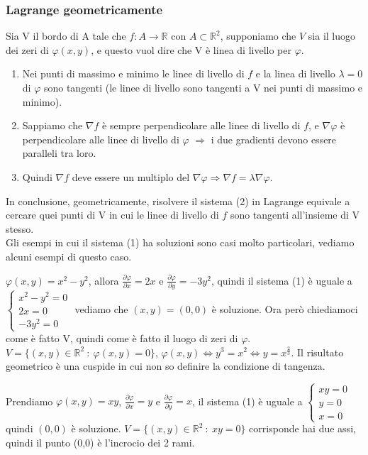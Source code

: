 \subsubsection{Lagrange geometricamente}
Sia V il bordo di A tale che $f: A \to \mathbb{R}$ con $A \subset \mathbb{R}^2$, supponiamo che $V$ sia il luogo dei zeri di $\varphi(x,y)$, e questo vuol dire che V è linea di livello per $\varphi$.
\begin{enumerate}
    \item Nei punti di massimo e minimo le linee di livello di $f$ e la linea di livello $\lambda=0$ di $\varphi$ sono tangenti (le linee di livello sono tangenti a V nei punti di massimo e minimo).
    \item Sappiamo che $\nabla f$ è sempre perpendicolare alle linee di livello di $f$, e $\nabla \varphi$ è perpendicolare alle linee di livello di $\varphi$ $\Longrightarrow$ i due gradienti devono essere paralleli tra loro.
    \item Quindi $\nabla f$ deve essere un multiplo del $\nabla \varphi \Longrightarrow \nabla f = \lambda \nabla \varphi$.
\end{enumerate}
In conclusione, geometricamente, risolvere il sistema (2) in Lagrange equivale a cercare quei punti di V in cui le linee di livello di $f$ sono tangenti all'insieme di V stesso.\\
Gli esempi in cui il sistema (1) ha soluzioni sono casi molto particolari, vediamo alcuni esempi di questo caso.
\begin{example}
$\varphi(x,y) = x^2 - y^2$, allora $\frac{\partial \varphi}{\partial x}= 2x$ e $\frac{\partial \varphi}{\partial y} = -3y^2$, quindi il sistema (1) è uguale a $\begin{cases}x^2 - y^2 = 0 \\ 2x= 0 \\ -3y^2 = 0\end{cases}$ vediamo che $(x,y) = (0,0)$ è soluzione. Ora però chiediamoci come è fatto V, quindi come è fatto il luogo di zeri di $\varphi$. $V= \{(x,y) \in \mathbb{R}^2 \::\: \varphi(x,y) = 0\}$, $\varphi(x,y) \Longleftrightarrow y^3 = x^2 \Longleftrightarrow y = x^{\frac{2}{3}}$. Il risultato geometrico è una cuspide in cui non so definire la condizione di tangenza.
\end{example}

\begin{example}
Prendiamo $\varphi(x,y) = xy$, $\frac{\partial \varphi}{\partial x} = y$ e $\frac{\partial \varphi}{\partial y} = x$, il sistema (1) è uguale a $\begin{cases}xy = 0\\y = 0\\x=0\end{cases}$ quindi $(0,0)$ è soluzione. $V = \{(x,y) \in \mathbb{R}^2 \::\: xy = 0\}$ corrisponde hai due assi, quindi il punto (0,0) è l'incrocio dei 2 rami. 
\end{example}



